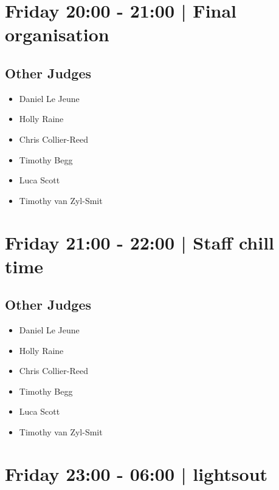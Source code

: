 \documentclass[10pt, A5]{article}
\begin{document}
            \section*{Friday 20:00
        -
        21:00
        |
         Final organisation}
        
                
        \subsection*{Other Judges}
        
            \begin{itemize}
                            \item Daniel Le Jeune
                            \item Holly Raine
                            \item Chris Collier-Reed
                            \item Timothy Begg
                            \item Luca Scott
                            \item Timothy van Zyl-Smit
                        \end{itemize}
        

            \section*{Friday 21:00
        -
        22:00
        |
         Staff chill time}
        
                
        \subsection*{Other Judges}
        
            \begin{itemize}
                            \item Daniel Le Jeune
                            \item Holly Raine
                            \item Chris Collier-Reed
                            \item Timothy Begg
                            \item Luca Scott
                            \item Timothy van Zyl-Smit
                        \end{itemize}
        

            \section*{Friday 23:00
        -
        06:00
        |
         lightsout}
        
\end{document}
